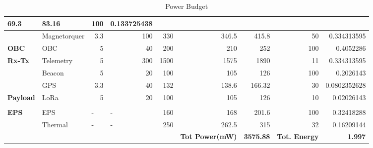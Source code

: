\begin{table}[h]
\begin{adjustbox}{width=\columnwidth,center}
\begin{tabular}{|l|l|r|r|r|r|r|r|r|}
 			69.3 &
 			83.16 &
 			100 &
 			0.133725438 \\ \hline
 			\rowcolor[HTML]{FFE6DD} 
 			&
 			Magnetorquer &
 			3.3 &
 			100 &
 			330 &
 			346.5 &
 			415.8 &
 			50 &
 			0.334313595 \\ \hline
 			\rowcolor[HTML]{FFE6DD} 
 			\textbf{OBC} &
 			OBC &
 			5 &
 			40 &
 			200 &
 			210 &
 			252 &
 			100 &
 			0.4052286 \\ \hline
 			\rowcolor[HTML]{FFE6DD} 
 			\textbf{Rx-Tx} &
 			Telemetry &
 			5 &
 			300 &
 			1500 &
 			1575 &
 			1890 &
 			11 &
 			0.334313595 \\ \hline
 			\rowcolor[HTML]{FFE6DD} 
 			&
 			Beacon &
 			5 &
 			20 &
 			100 &
 			105 &
 			126 &
 			100 &
 			0.2026143 \\ \hline
 			\rowcolor[HTML]{FFE6DD} 
 			&
 			GPS &
 			3.3 &
 			40 &
 			132 &
 			138.6 &
 			166.32 &
 			30 &
 			0.0802352628 \\ \hline
 			\rowcolor[HTML]{FFE6DD} 
 			\textbf{Payload} &
 			LoRa &
 			5 &
 			20 &
 			100 &
 			105 &
 			126 &
 			10 &
 			0.02026143 \\ \hline
 			\rowcolor[HTML]{FFE6DD} 
 			&
 			&
 			\multicolumn{1}{l|}{\cellcolor[HTML]{FFE6DD}} &
 			\multicolumn{1}{l|}{\cellcolor[HTML]{FFE6DD}} &
 			\multicolumn{1}{l|}{\cellcolor[HTML]{FFE6DD}} &
 			\multicolumn{1}{l|}{\cellcolor[HTML]{FFE6DD}} &
 			\multicolumn{1}{l|}{\cellcolor[HTML]{FFE6DD}} &
 			\multicolumn{1}{l|}{\cellcolor[HTML]{FFE6DD}} &
 			\multicolumn{1}{l|}{\cellcolor[HTML]{FFE6DD}} \\ \hline
 			\rowcolor[HTML]{FFE6DD} 
 			\textbf{EPS} &
 			EPS &
 			\multicolumn{1}{l|}{\cellcolor[HTML]{FFE6DD}-} &
 			\multicolumn{1}{l|}{\cellcolor[HTML]{FFE6DD}-} &
 			160 &
 			168 &
 			201.6 &
 			100 &
 			0.32418288 \\ \hline
 			\rowcolor[HTML]{FFE6DD} 
 			&
 			Thermal &
 			\multicolumn{1}{l|}{\cellcolor[HTML]{FFE6DD}-} &
 			\multicolumn{1}{l|}{\cellcolor[HTML]{FFE6DD}-} &
 			250 &
 			262.5 &
 			315 &
 			32 &
 			0.16209144 \\ \hline
 			\rowcolor[HTML]{FFE6DD} 
 			&
 			&
 			\multicolumn{1}{l|}{\cellcolor[HTML]{FFE6DD}} &
 			\multicolumn{1}{l|}{\cellcolor[HTML]{FFE6DD}} &
 			\multicolumn{1}{l|}{\cellcolor[HTML]{FFE6DD}} &
 			\multicolumn{1}{l|}{\cellcolor[HTML]{FFE6DD}\textbf{Tot Power(mW)}} &
 			\textbf{3575.88} &
 			\multicolumn{1}{l|}{\cellcolor[HTML]{FFE6DD}\textbf{Tot. Energy}} &
 			\textbf{1.997} \\ \hline
 		\end{tabular}
 	\end{adjustbox}
 \caption{Power Budget}
 \label{table:2}
 \end{table}
